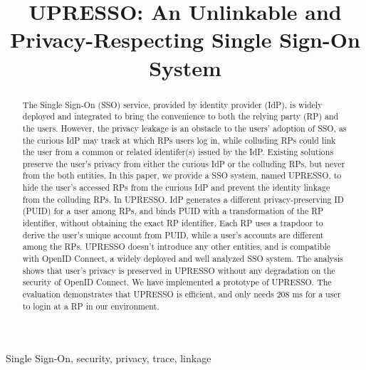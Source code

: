 \documentclass[conference, 10pt]{IEEEtran}
\begin{document}
\title{{UPRESSO}: An Unlinkable and Privacy-Respecting Single Sign-On System}
%
\maketitle
\begin{abstract}
 The Single Sign-On (SSO) service, provided by identity provider (IdP),  is widely deployed and integrated to bring the convenience to both the relying party (RP) and the users.
 However, the privacy leakage is an obstacle to the users' adoption of SSO, 
 as the curious IdP may track at which RPs users log in,
while colluding RPs could link the user from a common or related identifer(s) issued by the IdP.
 Existing solutions preserve the user's privacy  from either the curious IdP or the colluding RPs, but never from the both entities. 
In this paper, we provide a SSO system, named UPRESSO, to hide the user's accessed RPs from the curious IdP 
and prevent the identity linkage from the colluding RPs. 
In UPRESSO, IdP generates a different privacy-preserving ID (PUID) for a user among RPs, and binds PUID with a transformation of the RP identifier, without obtaining the exact RP identifier.
Each RP uses a trapdoor to derive the user's unique account from PUID, 
while a user's accounts are different among the RPs.
UPRESSO doesn't introduce any other entities, and  is compatible with OpenID Connect, a widely deployed and well analyzed SSO system. 
The analysis shows that user's privacy is preserved in UPRESSO without any degradation on the security of OpenID Connect.
We have implemented a prototype of UPRESSO. The evaluation demonstrates that UPRESSO is efficient, and only needs 208 ms for a user to login at a RP in our environment.
\end{abstract}
\begin{IEEEkeywords}
Single Sign-On, security, privacy, trace, linkage
\end{IEEEkeywords}
\end{document}
